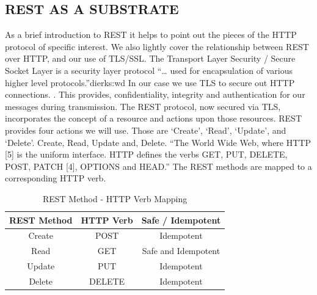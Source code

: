 \subsection{REST AS A SUBSTRATE}
     As a brief introduction to REST it helps to point out the pieces of the HTTP protocol of specific interest. We also lightly cover the relationship between REST over HTTP, and our use of TLS/SSL.   
     The Transport Layer Security / Secure Socket Layer is a security layer protocol “… used for encapsulation of various higher level protocols.”{dierks:wd}  In our case  we use TLS to secure out HTTP connections. \cite{Rescorla:2000tv}.  This provides, confidentiality, integrity and authentication for our messages during transmission. 
     The REST protocol, now secured via TLS, incorporates the concept of a resource and actions upon those resources. REST provides four actions we will use.  Those are ‘Create’, ‘Read’, ‘Update’, and ‘Delete’.  
     Create, Read, Update and, Delete.  
     “The World Wide Web, where HTTP [5] is the uniform interface. HTTP defines the verbs GET, PUT, DELETE, POST, PATCH [4], OPTIONS and HEAD.” 
      The REST methods are mapped to a corresponding HTTP verb.  \cite{Fielding:2000dd}

\begin{table}[ ]
\centering
\begin{tabular}{c|c|c}
 \bf REST Method & \bf HTTP Verb & \bf Safe / Idempotent \\
 \hline
      Create&  POST&  Idempotent\\
      Read & GET& Safe and Idempotent\\
      Update&  PUT& Idempotent\\
      Delete&  DELETE&  Idempotent\\
 \hline
\end{tabular}
\caption{REST Method - HTTP Verb Mapping}
\label{tab:restMapping}
\end{table}


